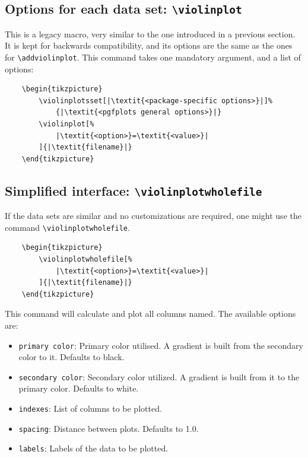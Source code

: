 \documentclass{article}
\begin{document}
\subsection{Options for each data set: \texttt{{\textbackslash}violinplot}}

This is a legacy macro, very similar to the one introduced in a previous
section. It is kept for backwards compatibility, and its options are the same as
the ones for \texttt{{\textbackslash}addviolinplot}.
This command takes one mandatory argument, and a list of options:

\begin{verbatim}
	\begin{tikzpicture}
		\violinplotsset[|\textit{<package-specific options>}|]%
			{|\textit{<pgfplots general options>}|}
		\violinplot[%
			|\textit{<option>}=\textit{<value>}|
		]{|\textit{filename}|}
	\end{tikzpicture}
\end{verbatim}

\subsection{Simplified interface: \texttt{{\textbackslash}violinplotwholefile}}

If the data sets are similar and no customizations are required, one might
use the command \texttt{{\textbackslash}violinplotwholefile}.

\begin{verbatim}
	\begin{tikzpicture}
		\violinplotwholefile[%
			|\textit{<option>}=\textit{<value>}|
		]{|\textit{filename}|}
	\end{tikzpicture}
\end{verbatim}

This command will calculate and plot all columns named. The available options
are:

\begin{itemize}
	\item \texttt{primary color}: Primary color utilised. A gradient is built from
		the secondary color to it. Defaults to black.
	\item \texttt{secondary color}: Secondary color utilized. A
		gradient is built from it to the primary color. Defaults
		to white.
	\item \texttt{indexes}: List of columns to be plotted.
	\item \texttt{spacing}: Distance between plots. Defaults to 1.0.
	\item \texttt{labels}: Labels of the data to be plotted.
\end{itemize}
\end{document}
